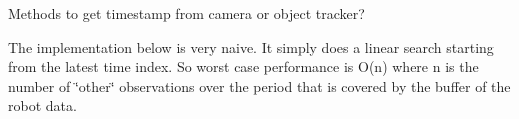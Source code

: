 
\begin{DoxyRefList}
\item[\label{todo__todo000001}%
\Hypertarget{todo__todo000001}%
Class \hyperlink{classrobot__fingers_1_1TriFingerPlatformFrontend}{robot\+\_\+fingers\+:\+:Tri\+Finger\+Platform\+Frontend} ]Methods to get timestamp from camera or object tracker?  
\item[\label{todo__todo000002}%
\Hypertarget{todo__todo000002}%
Member \hyperlink{classrobot__fingers_1_1TriFingerPlatformFrontend_a4c67fd3d8d1e887ed0f5b1b8ec2d30b3}{robot\+\_\+fingers\+:\+:Tri\+Finger\+Platform\+Frontend\+:\+:find\+\_\+matching\+\_\+timeindex} (const Frontend\+Type \&other\+\_\+frontend, const time\+\_\+series\+::\+Index t\+\_\+robot) const]The implementation below is very naive. It simply does a linear search starting from the latest time index. So worst case performance is O(n) where n is the number of \char`\"{}other\char`\"{} observations over the period that is covered by the buffer of the robot data.
\end{DoxyRefList}